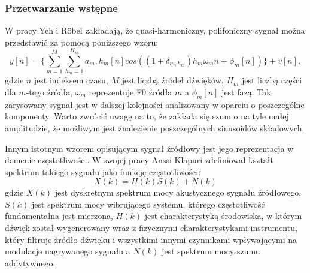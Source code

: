 \documentclass[12pt,a4paper,twoside]{mwart}
\begin{document}
\subsubsection{Przetwarzanie wstępne}\label{sec:preProcessing} 
W pracy 
\cite[1]{Transcription:Yeh:JointEvaluationF0} 
Yeh i Röbel zakładają, że quasi-harmoniczny, polifoniczny sygnał można przedstawić za pomocą poniższego wzoru:
\begin{equation}\label{eq:Yeh:signal}
y[n] = \{ \sum_{m=1}^{M}\sum_{h_m = 1}^{H_m}a_m,h_m[n]cos((1 + \delta_{m,h_m})h_m\omega_m n + \phi_m [n])\} + v[n],
\end{equation}
gdzie $n$ jest indeksem czasu, $M$ jest liczbą źródeł dźwięków, $H_m$ jest liczbą części dla $m$-tego źródła, $\omega_m$ reprezentuje F0 źródła $m$ a $\phi_m[n]$ jest fazą. Tak zarysowany sygnał jest w dalszej kolejności analizowany w oparciu o poszczególne komponenty. Warto zwrócić uwagę na to, że zakłada się szum o na tyle małej amplitudzie, że możliwym jest znalezienie poszczególnych sinusoidów składowych.

Innym istotnym wzorem opisującym sygnał źródłowy jest jego reprezentacja w domenie częstotliwości. W swojej pracy Anssi Klapuri 
\cite[806]{Transcription:Klapuri:MultipleFundamentalFrequencyEstimation} 
zdefiniował kształt spektrum takiego sygnału jako funkcję częstotliwości:
\begin{equation}\label{eq:Klapuri:spectrum}
X(k) = H(k)S(k) + N(k)
\end{equation}
gdzie $X(k)$ jest dyskretnym spektrum mocy akustycznego sygnału źródłowego, $S(k)$ jest spektrum mocy wibrującego systemu, którego częstotliwość fundamentalna jest mierzona, $H(k)$ jest charakterystyką środowiska, w którym dźwięk został wygenerowany wraz z fizycznymi charakterystykami instrumentu, który filtruje źródło dźwięku i wszystkimi innymi czynnikami wpływającymi na modulacje nagrywanego sygnału a $N(k)$ jest spektrum mocy szumu addytywnego. 
\end{document}
